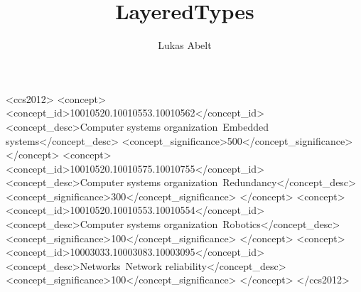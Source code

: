 \documentclass[acmsmall, review, screen]{acmart}
\begin{document}
\title{LayeredTypes}

\author{Lukas Abelt}


\begin{abstract}
\end{abstract}

\begin{CCSXML}
<ccs2012>
 <concept>
  <concept_id>10010520.10010553.10010562</concept_id>
  <concept_desc>Computer systems organization~Embedded systems</concept_desc>
  <concept_significance>500</concept_significance>
 </concept>
 <concept>
  <concept_id>10010520.10010575.10010755</concept_id>
  <concept_desc>Computer systems organization~Redundancy</concept_desc>
  <concept_significance>300</concept_significance>
 </concept>
 <concept>
  <concept_id>10010520.10010553.10010554</concept_id>
  <concept_desc>Computer systems organization~Robotics</concept_desc>
  <concept_significance>100</concept_significance>
 </concept>
 <concept>
  <concept_id>10003033.10003083.10003095</concept_id>
  <concept_desc>Networks~Network reliability</concept_desc>
  <concept_significance>100</concept_significance>
 </concept>
</ccs2012>
\end{CCSXML}
\end{document}
